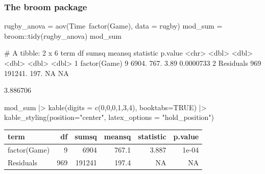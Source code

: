 \documentclass[a4paper]{article}\usepackage[]{graphicx}\usepackage[]{xcolor}
\begin{document}
\subsubsection{The broom package}
\begin{Schunk}
\begin{Sinput}
rugby_anova = aov(Time~factor(Game), data = rugby)
mod_sum = broom::tidy(rugby_anova)
mod_sum
\end{Sinput}
\begin{Soutput}
# A tibble: 2 x 6
  term            df   sumsq meansq statistic    p.value
  <chr>        <dbl>   <dbl>  <dbl>     <dbl>      <dbl>
1 factor(Game)     9   6904.   767.      3.89  0.0000733
2 Residuals      969 191241.   197.     NA    NA        
\end{Soutput}
\begin{Soutput}
[1] 3.886706
\end{Soutput}
\begin{Sinput}
mod_sum |> kable(digits = c(0,0,0,1,3,4), booktabs=TRUE) |>
  kable_styling(position="center", latex_options = "hold_position")
\end{Sinput}
\begin{table}[!h]
\centering
\begin{tabular}{lrrrrr}
\toprule
term & df & sumsq & meansq & statistic & p.value\\
\midrule
factor(Game) & 9 & 6904 & 767.1 & 3.887 & 1e-04\\
Residuals & 969 & 191241 & 197.4 & NA & NA\\
\bottomrule
\end{tabular}
\end{table}

\end{Schunk}
\end{document}
